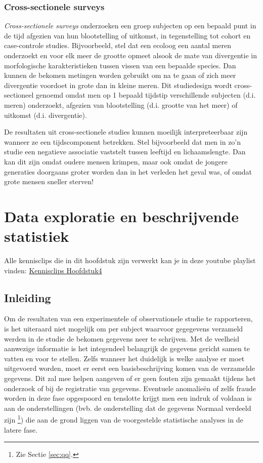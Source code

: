 \documentclass[
  12pt,dutch,coursenotes]{book}
\theoremstyle{definition}
\theoremstyle{definition}
\theoremstyle{definition}
\theoremstyle{remark}
\begin{document}
\hypertarget{cross-sectionele-surveys}{%
\subsection{Cross-sectionele surveys}\label{cross-sectionele-surveys}}

\emph{Cross-sectionele surveys} onderzoeken een groep subjecten op een
bepaald punt in de tijd afgezien van hun blootstelling of uitkomst, in
tegenstelling tot cohort en case-controle studies. Bijvoorbeeld, stel dat een ecoloog een aantal meren onderzoekt en voor elk meer de grootte opmeet alsook de mate van divergentie in morfologische karakteristieken tussen vissen van een bepaalde species.
Dan kunnen de bekomen metingen worden gebruikt om na te gaan of zich meer divergentie voordoet in grote dan in kleine meren. Dit studiedesign wordt cross-sectioneel genoemd omdat men op 1 bepaald tijdstip verschillende subjecten (d.i. meren) onderzoekt, afgezien van blootstelling (d.i. grootte van het meer) of uitkomst (d.i. divergentie).

De resultaten uit cross-sectionele studies kunnen moeilijk interpreteerbaar zijn wanneer ze een tijdscomponent betrekken. Stel bijvoorbeeld dat men in zo'n studie een negatieve associatie
vaststelt tussen leeftijd en lichaamslengte. Dan kan dit zijn omdat oudere
mensen krimpen, maar ook omdat de jongere generaties doorgaans groter worden
dan in het verleden het geval was, of omdat grote mensen sneller sterven!

\hypertarget{chap:describe}{%
\chapter{Data exploratie en beschrijvende statistiek}\label{chap:describe}}

Alle kennisclips die in dit hoofdstuk zijn verwerkt kan je in deze youtube playlist vinden: \href{https://www.youtube.com/watch?v=AVd-8WE_DhU\&list=PLZH1hP8_LbJLKTeg_D9CHC3xbk0nfBa-1}{Kennisclips Hoofdstuk4}

\hypertarget{inleiding}{%
\section{Inleiding}\label{inleiding}}

Om de resultaten van een experimentele of observationele studie te
rapporteren, is het uiteraard niet mogelijk om per subject waarvoor gegegevens verzameld werden in de studie de bekomen gegevens neer te schrijven. Met
de veelheid aanwezige informatie is het integendeel belangrijk de gegevens
gericht samen te vatten en voor te stellen. Zelfs wanneer het duidelijk is welke analyse er moet uitgevoerd worden, moet er eerst een
basisbeschrijving komen van de verzamelde gegevens. Dit zal mee helpen
aangeven of er geen fouten zijn gemaakt tijdens het onderzoek of bij de
registratie van gegevens. Eventuele anomalieën of zelfs fraude worden in
deze fase opgespoord en tenslotte krijgt men een indruk of voldaan is aan de
onderstellingen (bvb. de onderstelling dat de gegevens Normaal verdeeld zijn
\footnote{Zie Sectie \ref{sec:qq}.}) die aan de grond liggen van de voorgestelde
statistische analyses in de latere fase.
\end{document}
